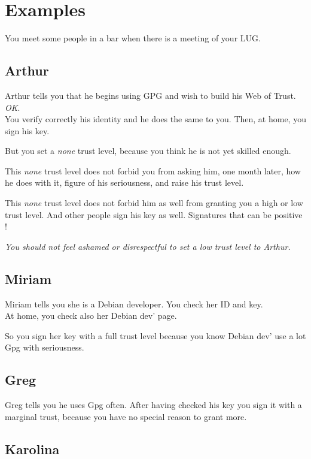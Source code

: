 \section{Examples}\label{examples}

You meet some people in a bar when there is a meeting of your LUG.

\subsection{Arthur}\label{arthur}

Arthur tells you that he begins using GPG and wish to build his Web of
Trust. \emph{OK}.\\You verify correctly his identity and he does the
same to you. Then, at home, you sign his key.

But you set a \emph{none} trust level, because you think he is not yet
skilled enough.

This \emph{none} trust level does not forbid you from asking him, one
month later, how he does with it, figure of his seriousness, and raise
his trust level.

This \emph{none} trust level does not forbid him as well from granting
you a high or low trust level. And other people sign his key as well.
Signatures that can be positive !

\emph{You should not feel ashamed or disrespectful to set a low trust
level to Arthur.}

\subsection{Miriam}\label{miriam}

Miriam tells you she is a Debian developer. You check her ID and
key.\\At home, you check also her Debian dev' page.

So you sign her key with a full trust level because you know Debian dev'
use a lot Gpg with seriousness.

\subsection{Greg}\label{greg}

Greg tells you he uses Gpg often. After having checked his key you sign
it with a marginal trust, because you have no special reason to grant
more.

\subsection{Karolina}\label{karolina}

